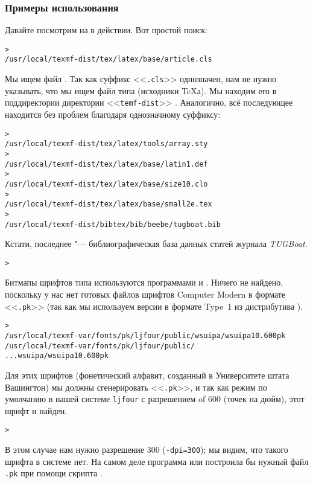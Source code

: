 \documentclass{article}
\renewcommand{\samp}[1]{<<\texttt{#1}>>}
\begin{document}
\subsubsection{Примеры использования}
\label{sec:examples-of-use}

Давайте посмотрим на  \KPS{}  в действии. Вот простой поиск:

\begin{alltt}
> 
 /usr/local/texmf-dist/tex/latex/base/article.cls
\end{alltt}
Мы ищем файл . Так как суффикс \samp{.cls}
однозначен, нам не нужно указывать, что мы ищем файл типа
 (исходники \TeX{}а). Мы находим его в поддиректории
 директории \samp{temf-dist} \TL.  Аналогично,
всё последующее находится без проблем благодаря однозначному суффиксу:
\begin{alltt}
> 
   /usr/local/texmf-dist/tex/latex/tools/array.sty
> 
   /usr/local/texmf-dist/tex/latex/base/latin1.def
> 
   /usr/local/texmf-dist/tex/latex/base/size10.clo
> 
   /usr/local/texmf-dist/tex/latex/base/small2e.tex
> 
   /usr/local/texmf-dist/bibtex/bib/beebe/tugboat.bib
\end{alltt}

Кстати, последнее "--- библиографическая база данных статей журнала 
\textsl{TUGBoat}. 

\begin{alltt}
> 
\end{alltt}
Битмапы шрифтов типа  используются программами
 и .  Ничего не найдено, поскольку у нас
нет готовых файлов шрифтов Computer Modern в формате \samp{.pk} (так
как мы используем версии в формате Type~1 из дистрибутива \TL{}).
\begin{alltt}
> 
\ifSingleColumn   /usr/local/texmf-var/fonts/pk/ljfour/public/wsuipa/wsuipa10.600pk
\else  /usr/local/texmf-var/fonts/pk/ljfour/public/
...                         wsuipa/wsuipa10.600pk
\fi\end{alltt}
Для этих шрифтов  (фонетический алфавит, созданный в Университете
штата Вашингтон) мы должны сгенерировать
\samp{.pk}, и так как режим  \MF{} по умолчанию в нашей системе 
\texttt{ljfour} с разрешением of 600\dpi{} (точек на дюйм), этот шрифт
и найден. 
\begin{alltt}
> 
\end{alltt}
В этом случае нам нужно разрешение 300\dpi{} (\texttt{-dpi=300}); мы
видим, что такого шрифта в системе нет.  На самом деле программа
 или  построила бы нужный файл
\texttt{.pk} при помощи скрипта .
\end{document}
